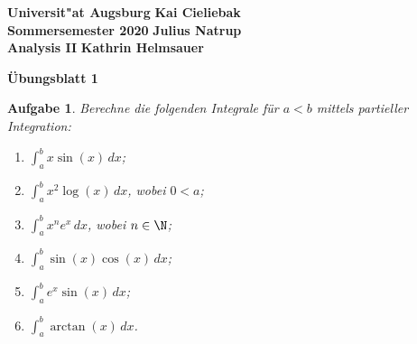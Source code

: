 \newtheorem{prob}{Aufgabe}
\newtheorem{wrongsol}{Falsche L\"osung}[prob]
\newtheorem{sol}{L\"osung}



\pagestyle{empty}
\textbf{Universit"at Augsburg} \hfill \textbf{Kai Cieliebak} \\
\textbf{Sommersemester 2020} \hfill \textbf{Julius Natrup} \\
\textbf{Analysis II} \hfill \textbf{Kathrin Helmsauer}
\vspace{0.5cm}
\begin{center} \textbf{\Large \"Ubungsblatt 1} \end{center}
\vspace{1cm}


\begin{prob} 
Berechne die folgenden Integrale f\"ur $a<b$ mittels partieller Integration:

\begin{enumerate}[label=(\alph*)]
\item $\int_a^b x\sin(x)\,dx$;
\item $\int_a^b x^2\log(x)\,dx$, wobei $0<a$;
\item $\int_a^b x^n e^x\,dx$, wobei $n\in\N$;
\item $\int_a^b \sin(x)\cos(x)\,dx$;
\item $\int_a^b e^x\sin(x)\,dx$;
\item $\int_a^b \arctan(x)\,dx$.
\end{enumerate}
\end{prob}

\vspace{0.3cm}

